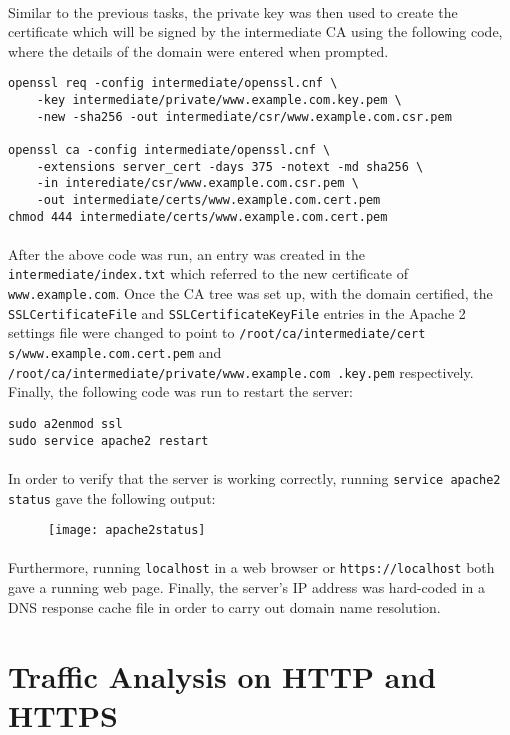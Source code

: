 \paragraph{ }Similar to the previous tasks, the private key was then used to create the certificate which will be signed by the intermediate CA using the following code, where the details of the domain were entered when prompted.

\begin{verbatim}
openssl req -config intermediate/openssl.cnf \
    -key intermediate/private/www.example.com.key.pem \
    -new -sha256 -out intermediate/csr/www.example.com.csr.pem

openssl ca -config intermediate/openssl.cnf \
    -extensions server_cert -days 375 -notext -md sha256 \
    -in interediate/csr/www.example.com.csr.pem \
    -out intermediate/certs/www.example.com.cert.pem
chmod 444 intermediate/certs/www.example.com.cert.pem
\end{verbatim}

\paragraph{ }After the above code was run, an entry was created in the \texttt{intermediate/index.txt} which referred to the new certificate of \texttt{www.example.com}. Once the CA tree was set up, with the domain certified, the \texttt{SSLCertificateFile} and \texttt{SSLCertificateKeyFile} entries in the Apache 2 settings file were changed to point to \texttt{/root/ca/intermediate/cert s/www.example.com.cert.pem} and \texttt{/root/ca/intermediate/private/www.example.com .key.pem} respectively. Finally, the following code was run to restart the server:

\begin{verbatim}
sudo a2enmod ssl
sudo service apache2 restart
\end{verbatim}

\paragraph{ }In order to verify that the server is working correctly, running \texttt{service apache2 status} gave the following output:

\begin{figure}[!h]
	\centering
	\texttt{[image: apache2status]}
\end{figure}

\paragraph{ }Furthermore, running \texttt{localhost} in a web browser or \texttt{https://localhost} both gave a running web page. Finally, the server's IP address was hard-coded in a DNS response cache file in order to carry out domain name resolution.

\section{Traffic Analysis on HTTP and HTTPS} 